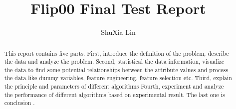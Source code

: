 \documentclass{amsart}
\begin{document}
%
%
\title[A Short Running Title]{Flip00 Final Test Report}%

\author{ShuXia Lin}
\address[A.~1]{School of Computer Science,\\ 
SouthEast University, Nanjing , China}%




%
\date{\gitAuthorDate}%

\begin{abstract}
This report contains five parts. 
First, 
introduce the definition of the problem,
describe the data and analyze the problem. 
Second, 
statistical the data information, 
visualize the data to find some potential relationships 
between the attribute values 
and process the data 
like dummy variables, feature engineering, feature selection etc. 
Third, 
explain the principle and parameters 
of different algorithms
Fourth,
experiment and analyze the performance of different algorithms
based on experimental result.
The last one is conclusion . 
\end{abstract}

\maketitle
\tableofcontents

\newpage






\newpage



\listoftodos
\end{document}

